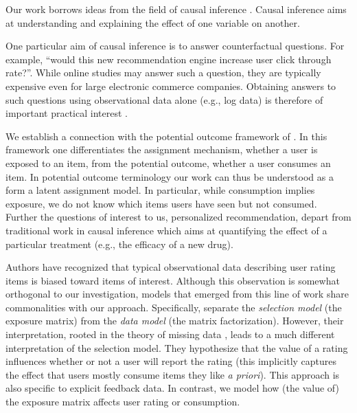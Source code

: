  Our work borrows ideas from the field of
causal inference \citep{pearl2009causality,imbens2015causal}. Causal inference aims at understanding and
explaining the effect of one variable on another. 

One particular aim of causal inference is to answer counterfactual
questions. For example, ``would this new recommendation engine increase
user click through rate?''.  While online studies may answer such a question, they are
typically expensive even for large electronic commerce companies.
Obtaining answers to such questions using observational data alone (e.g.,
log data) is therefore of important practical
interest \citep{bottou2015counterfactual,li2010contextual,swaminathan2015counterfactual}.

We establish a connection with the potential outcome framework of
\citet{rubin1974ece}. In this framework one differentiates the assignment mechanism,
whether a user is exposed to an item, from the potential outcome, whether a
user consumes an item. In potential outcome terminology our work can thus
be understood as a form a latent assignment model. In particular, while
consumption implies exposure, we do not know which items users have 
seen but not consumed. Further the questions of interest to us,
personalized recommendation, depart from traditional work in causal
inference which aims at quantifying the effect of a particular treatment
(e.g., the efficacy of a new drug). 


 Authors have recognized that typical
observational data describing user rating items is biased toward items of
interest. Although this observation is somewhat orthogonal to our
investigation, models that emerged from this line of work share
commonalities with our approach.  Specifically, \citet{DBLP:conf/uai/MarlinZRS07,ling12response}
separate the \emph{selection model} (the exposure matrix) from the
\emph{data model} (the matrix factorization). However, their
interpretation, rooted in the theory of missing data \citep{little1986statistical}, leads to a
much different interpretation of the selection model. They hypothesize
that the value of a rating influences whether or not a user will report
the rating (this implicitly captures the effect that users mostly consume
items they like \emph{a priori}). This approach is also specific to
explicit feedback data. In contrast, we model how (the value of) the
exposure matrix affects user rating or consumption. 

